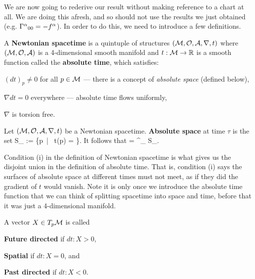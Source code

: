 We are now going to rederive our result without making reference to a chart at all. We are doing this afresh, and so should not use the results we just obtained (e.g. ${\Gamma^{\alpha}}_{00} = -f^{\alpha}$). In order to do this, we need to introduce a few definitions. 

    A \textbf{Newtonian spacetime} is a quintuple of structures $(\mathcal{M},\mathcal{O},\mathcal{A},\nabla,t)$ where $(\mathcal{M},\mathcal{O},\mathcal{A})$ is a 4-dimensional smooth manifold and $t:\mathcal{M}\to \mathbb{R}$ is a smooth function called the \textbf{absolute time}, which satisfies:
    \benr 
        \item $(dt)_p\neq 0$ for all $p\in\mathcal{M}$ --- there is a concept of \textit{absolute space} (defined below),
        \item $\nabla dt = 0$ everywhere --- absolute time flows uniformly,
        \item $\nabla$ is torsion free. 
    \een 
\ed 

    Let $(\mathcal{M},\mathcal{O},\mathcal{A},\nabla,t)$ be a Newtonian spacetime. \textbf{Absolute space} at time $\tau$ is the set 
    \bse 
        S_{\tau} := \{p\in\cM \, | \, t(p) = \tau\}. 
    \ese 
    It follows that 
    \bse 
        \cM = \bigcup^{\bullet}_{\tau} S_{\tau}.
    \ese 
\ed 

Condition (i) in the definition of Newtonian spacetime is what gives us the disjoint union in the definition of absolute time. That is, condition (i) says the surfaces of absolute space at different times must not meet, as if they did the gradient of $t$ would vanish. Note it is only once we introduce the absolute time function that we can think of splitting spacetime into space and time, before that it was just a 4-dimensional manifold. 

    A vector $X\in T_p\mathcal{M}$ is called
    \benr 
        \item \textbf{Future directed} if $dt:X>0$, 
        \item \textbf{Spatial} if $dt:X =0$, and
        \item \textbf{Past directed} if $dt:X<0$.
    \een 
\ed 


